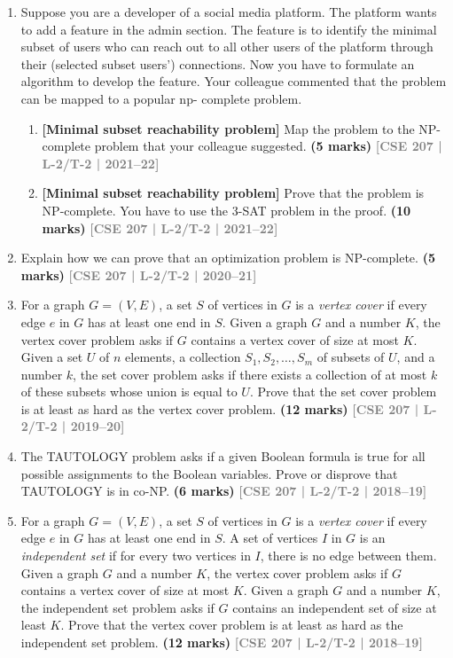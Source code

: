 \documentclass[12pt]{article}
\newcommand{\yr}[1]{\hfill\textcolor{gray}{\small\textbf{[#1]}}}
\newcommand{\mk}[1]{\textcolor{orange!70!black}{\small\textbf{(#1 marks)}}}
\begin{document}
\begin{enumerate}
\item Suppose you are a developer of a social media platform. The platform wants to 
    add a feature in the admin section. The feature is to identify the minimal subset of 
    users who can reach out to all other users of the platform through their (selected 
    subset users') connections. Now you have to formulate an algorithm to develop the 
    feature. Your colleague commented that the problem can be mapped to a popular np-
    complete problem.
\begin{enumerate}

\item \textbf{[Minimal subset reachability problem]} Map the problem to the NP-complete problem that your colleague suggested.
\mk{5} \yr{CSE 207 | L-2/T-2 | 2021--22}

\item \textbf{[Minimal subset reachability problem]} Prove that the problem is NP-complete. You have to use the 3-SAT problem in the proof.
\mk{10} \yr{CSE 207 | L-2/T-2 | 2021--22}
\end{enumerate}


\item Explain how we can prove that an optimization problem is NP-complete.
\mk{5} \yr{CSE 207 | L-2/T-2 | 2020--21}


\item For a graph $G = (V, E)$, a set $S$ of vertices in $G$ is a \textit{vertex cover} if every edge $e$ in $G$ has at least one end in $S$. Given a graph $G$ and a number $K$, the vertex cover problem asks if $G$ contains a vertex cover of size at most $K$. Given a set $U$ of $n$ elements, a collection $S_1, S_2, \ldots, S_m$ of subsets of $U$, and a number $k$, the set cover problem asks if there exists a collection of at most $k$ of these subsets whose union is equal to $U$. Prove that the set cover problem is at least as hard as the vertex cover problem.
\mk{12} \yr{CSE 207 | L-2/T-2 | 2019--20}




\item The TAUTOLOGY problem asks if a given Boolean formula is true for all possible assignments to the Boolean variables. Prove or disprove that TAUTOLOGY is in co-NP.
\mk{6} \yr{CSE 207 | L-2/T-2 | 2018--19}


\item For a graph $G = (V, E)$, a set $S$ of vertices in $G$ is a \textit{vertex cover} if every edge $e$ in $G$ has at least one end in $S$. A set of vertices $I$ in $G$ is an \textit{independent set} if for every two vertices in $I$, there is no edge between them. Given a graph $G$ and a number $K$, the vertex cover problem asks if $G$ contains a vertex cover of size at most $K$. Given a graph $G$ and a number $K$, the independent set problem asks if $G$ contains an independent set of size at least $K$. Prove that the vertex cover problem is at least as hard as the independent set problem.
\mk{12} \yr{CSE 207 | L-2/T-2 | 2018--19}



\end{enumerate}
\end{document}
